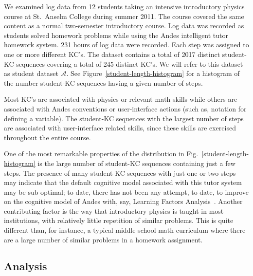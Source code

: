 \documentclass{acmlarge-edm}
\begin{document}
We examined log data from 12 students taking an intensive introductory
physics course at St.\ Anselm College during summer 2011.  The course
covered the same content as a normal two-semester introductory course.
Log data was recorded as students solved homework problems while using
the Andes intelligent tutor homework system.  231 hours of log data
were recorded.
Each step was assigned to one or more different KC's.  The dataset
contains a total of 2017 distinct student-KC sequences covering a total of
245 distinct KC's.  We will refer to this dataset as student dataset
$\mathcal{A}$.  See Figure~\ref{student-length-histogram} for a
histogram of the number student-KC sequences having a given number of
steps.

Most KC's are associated with physics
or relevant math skills while others are associated with 
Andes conventions or user-interface actions (such as, notation
for defining a variable).  The student-KC sequences with the largest 
number of steps are associated with user-interface related skills,
since these skills are exercised throughout the entire course. 

One of the most remarkable properties of the distribution in
Fig.~\ref{student-length-histogram} is the large number of
student-KC sequences containing just a few steps.
The presence of many student-KC sequences with just one or two
steps may indicate that the default cognitive model associated 
with this tutor system may be sub-optimal; to date, there has not 
been any attempt, to date, to improve on the cognitive model of 
Andes with, say, Learning Factors Analysis~\cite{cen_learning_2006}.
Another contributing factor is the way that introductory physics is 
taught in most institutions, with relatively little repetition of 
similar problems.  This is quite different than, for instance, 
a typical middle school math curriculum where there are a large number
of similar problems in a homework assignment.

\subsection{Analysis}
\end{document}
